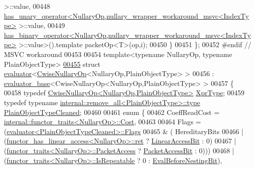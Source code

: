 \begin{DoxyCode}
       >::value,
00448     \hyperlink{struct_eigen_1_1internal_1_1has__unary__operator}{has\_unary\_operator<NullaryOp,nullary\_wrapper\_workaround\_msvc<IndexType>}
       >::value,
00449     \hyperlink{struct_eigen_1_1internal_1_1has__binary__operator}{has\_binary\_operator<NullaryOp,nullary\_wrapper\_workaround\_msvc<IndexType>}
       >::value>().\textcolor{keyword}{template} packetOp<T>(op,i);
00450   \}
00451 \};
00452 \textcolor{preprocessor}{#endif // MSVC workaround}
00453 
00454 \textcolor{keyword}{template}<\textcolor{keyword}{typename} NullaryOp, \textcolor{keyword}{typename} PlainObjectType>
\hyperlink{struct_eigen_1_1internal_1_1evaluator_3_01_cwise_nullary_op_3_01_nullary_op_00_01_plain_object_type_01_4_01_4}{00455} \textcolor{keyword}{struct }\hyperlink{struct_eigen_1_1internal_1_1evaluator}{evaluator}<\hyperlink{group___core___module_class_eigen_1_1_cwise_nullary_op}{CwiseNullaryOp}<NullaryOp,PlainObjectType> >
00456   : \hyperlink{struct_eigen_1_1internal_1_1evaluator__base}{evaluator\_base}<CwiseNullaryOp<NullaryOp,PlainObjectType> >
00457 \{
00458   \textcolor{keyword}{typedef} \hyperlink{group___core___module_class_eigen_1_1_cwise_nullary_op}{CwiseNullaryOp<NullaryOp,PlainObjectType>} 
      \hyperlink{group___core___module_class_eigen_1_1_cwise_nullary_op}{XprType};
00459   \textcolor{keyword}{typedef} \textcolor{keyword}{typename} \hyperlink{group___sparse_core___module}{internal::remove\_all<PlainObjectType>::type} 
      \hyperlink{group___sparse_core___module}{PlainObjectTypeCleaned};
00460   
00461   \textcolor{keyword}{enum} \{
00462     CoeffReadCost = \hyperlink{struct_eigen_1_1internal_1_1functor__traits}{internal::functor\_traits<NullaryOp>::Cost},
00463     
00464     Flags = (\hyperlink{struct_eigen_1_1internal_1_1evaluator}{evaluator<PlainObjectTypeCleaned>::Flags}
00465           &  (  HereditaryBits
00466               | (\hyperlink{struct_eigen_1_1internal_1_1functor__has__linear__access}{functor\_has\_linear\_access<NullaryOp>::ret}  ? 
      \hyperlink{group__flags_ga4b983a15d57cd55806df618ac544d09e}{LinearAccessBit} : 0)
00467               | (\hyperlink{struct_eigen_1_1internal_1_1functor__traits}{functor\_traits<NullaryOp>::PacketAccess}    ? 
      \hyperlink{group__flags_ga1a306a438e1ab074e8be59512e887b9f}{PacketAccessBit} : 0)))
00468           | (\hyperlink{struct_eigen_1_1internal_1_1functor__traits}{functor\_traits<NullaryOp>::IsRepeatable} ? 0 : 
      \hyperlink{group__flags_gaa34e83bae46a8eeae4e69ebe3aaecbed}{EvalBeforeNestingBit}),

\end{DoxyCode}
